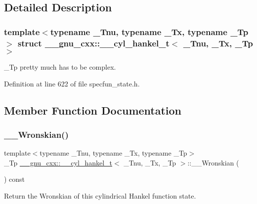 \subsection{Detailed Description}
\subsubsection*{template$<$typename \+\_\+\+Tnu, typename \+\_\+\+Tx, typename \+\_\+\+Tp$>$\newline
struct \+\_\+\+\_\+gnu\+\_\+cxx\+::\+\_\+\+\_\+cyl\+\_\+hankel\+\_\+t$<$ \+\_\+\+Tnu, \+\_\+\+Tx, \+\_\+\+Tp $>$}

\+\_\+\+Tp pretty much has to be complex. 

Definition at line 622 of file specfun\+\_\+state.\+h.



\subsection{Member Function Documentation}
\mbox{\label{struct____gnu__cxx_1_1____cyl__hankel__t_a8a41c4698706cb51006f2d8ebb5d8053}} 
\subsubsection{\texorpdfstring{\+\_\+\+\_\+\+Wronskian()}{\_\_Wronskian()}}
{\footnotesize\ttfamily template$<$typename \+\_\+\+Tnu, typename \+\_\+\+Tx, typename \+\_\+\+Tp$>$ \\
\+\_\+\+Tp \hyperlink{struct____gnu__cxx_1_1____cyl__hankel__t}{\+\_\+\+\_\+gnu\+\_\+cxx\+::\+\_\+\+\_\+cyl\+\_\+hankel\+\_\+t}$<$ \+\_\+\+Tnu, \+\_\+\+Tx, \+\_\+\+Tp $>$\+::\+\_\+\+\_\+\+Wronskian (\begin{DoxyParamCaption}{ }\end{DoxyParamCaption}) const\hspace{0.3cm}{\ttfamily [inline]}}



Return the Wronskian of this cylindrical Hankel function state. 




